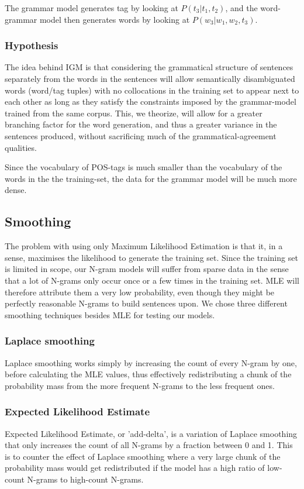 \documentclass[a4paper,12pt]{article}
\begin{document}
The grammar model generates tag by looking at $P(t_3|t_1,t_2)$, and the word-grammar model then generates words by looking at $P(w_3|w_1,w_2,t_3)$.

\subsubsection{Hypothesis}
The idea behind IGM is that considering the grammatical structure of sentences separately from the words in the sentences will allow semantically disambiguated words (word/tag tuples) with no collocations in the training set to appear next to each other as long as they satisfy the constraints imposed by the grammar-model trained from the same corpus. This, we theorize, will allow for a greater branching factor for the word generation, and thus a greater variance in the sentences produced, without sacrificing much of the grammatical-agreement qualities.

Since the vocabulary of POS-tags is much smaller than the vocabulary of the words in the the training-set, the data for the grammar model will be much more dense.

\subsection{Smoothing}
\label{subsec:smoothing}

The problem with using only Maximum Likelihood Estimation is that it, in a sense, maximises the likelihood to generate the training set. Since the training set is limited in scope, our N-gram models will suffer from sparse data in the sense that a lot of N-grams only occur once or a few times in the training set. MLE will therefore attribute them a very low probability, even though they might be perfectly reasonable N-grams to build sentences upon. We chose three different smoothing techniques besides MLE for testing our models.

\subsubsection{Laplace smoothing}
Laplace smoothing works simply by increasing the count of every N-gram by one, before calculating the MLE values, thus effectively redistributing a chunk of the probability mass from the more frequent N-grams to the less frequent ones.

\subsubsection{Expected Likelihood Estimate}
Expected Likelihood Estimate, or 'add-delta', is a variation of Laplace smoothing that only increases the count of all N-grams by a fraction between 0 and 1. This is to counter the effect of Laplace smoothing where a very large chunk of the probability mass would get redistributed if the model has a high ratio of low-count N-grams to high-count N-grams.
\end{document}
